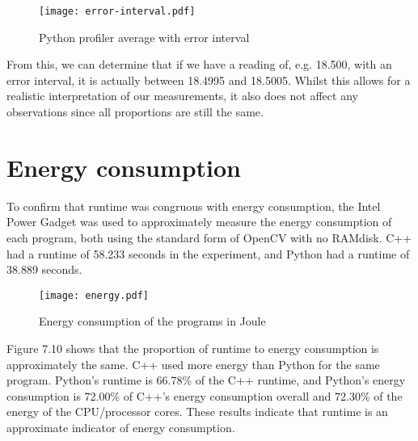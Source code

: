 \begin{figure}[H]
	\centering
	\texttt{[image: error-interval.pdf]}
	\caption{Python profiler average with error interval}
	\label{figure:error-interval}
\end{figure}

From this, we can determine that if we have a reading of, e.g. 18.500, with an error interval, it is actually between 18.4995 and 18.5005. Whilst this allows for a realistic interpretation of our measurements, it also does not affect any observations since all proportions are still the same.

\section{Energy consumption}
To confirm that runtime was congruous with energy consumption, the Intel Power Gadget was used to approximately measure the energy consumption of each program, both using the standard form of OpenCV with no RAMdisk. C++ had a runtime of 58.233 seconds in the experiment, and Python had a runtime of 38.889 seconds.

\begin{figure}[H]
	\centering
	\texttt{[image: energy.pdf]}
	\caption{Energy consumption of the programs in Joule}
	\label{figure:energy-consumption}
\end{figure}

Figure 7.10 shows that the proportion of runtime to energy consumption is approximately the same. C++ used more energy than Python for the same program. Python’s runtime is 66.78\% of the C++ runtime, and Python’s energy consumption is 72.00\% of C++’s energy consumption overall and 72.30\% of the energy of the CPU/processor cores. These results indicate that runtime is an approximate indicator of energy consumption.
